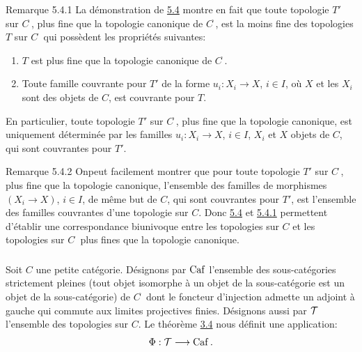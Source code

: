 \documentclass[10pt]{../fichiers-configuration-latex/smfart}
\begin{document}
\begin{enonce*}[remark]{Remarque 5.4.1}
La démonstration de \hyperref[II.prop5.4]{5.4} montre en fait que toute
topologie $T'$ sur $C^{\widehat{\phantom{,}}}$, plus fine que la
topologie canonique de $C^{\widehat{\phantom{,}}}$, est la moins
fine des topologies $T$ sur $C^{\widehat{\phantom{,}}}$ qui
possèdent les propriétés suivantes:
\begin{enumerate}
\renewcommand{\theenumi}{\alph{enumi}}
\renewcommand{\labelenumi}{\theenumi)}
\item $T$ est plus fine que la topologie canonique de
  $C^{\widehat{\phantom{,}}}$.

\item Toute famille couvrante pour $T'$ de la forme
  $u_i:X_i\rightarrow X$, $i\in I$, où $X$ et les $X_i$ sont des
  objets de $C$, est couvrante pour $T$.
\end{enumerate}
\end{enonce*}

En particulier, toute topologie $T'$ sur
$C^{\widehat{\phantom{,}}}$, plus fine que la topologie canonique,
est uniquement déterminée par les familles $u_i:X_i\rightarrow
X$, $i\in I$, $X_i$ et $X$ objets de $C$, qui sont couvrantes pour
$T'$.

\begin{enonce*}[remark]{Remarque 5.4.2}
On\pageoriginale peut facilement montrer que pour toute topologie
$T'$ sur $C^{\widehat{\phantom{,}}}$, plus fine que la topologie
canonique, l'ensemble des familles de morphismes $(X_i\rightarrow
X)$, $i\in I$, de même but de $C$, qui sont couvrantes pour $T'$,
est l'ensemble des familles couvrantes d'une topologie sur $C$. Donc
\hyperref[II.prop5.4]{5.4} et \hyperref[II.rem5.4.1]{5.4.1} permettent d'établir une
correspondance biunivoque entre les topologies sur $C$ et les
topologies sur $C^{\widehat{\phantom{,}}}$ plus fines que la
topologie canonique.
\end{enonce*}

\setcounter{subsection}{5} \setcounter{subsubsection}{-1}
\subsubsection{}
Soit $C$ une petite catégorie. Désignons par $\operatorname{Caf}$ l'ensemble des
sous-catégories strictement pleines (tout objet isomorphe à un objet
de la sous-catégorie est un objet de la sous-catégorie) de
$C^{\widehat{\phantom{,}}}$ dont le foncteur d'injection admette un
adjoint à gauche qui commute aux limites projectives finies.
Désignons aussi par ${\mathcal T}$ l'ensemble des topologies sur $C$. Le
théorème \hyperref[II.theo3.4]{3.4} nous définit une application:
$$
\Phi:{\mathcal T}\longrightarrow \operatorname{Caf}{}.
$$
\end{document}
